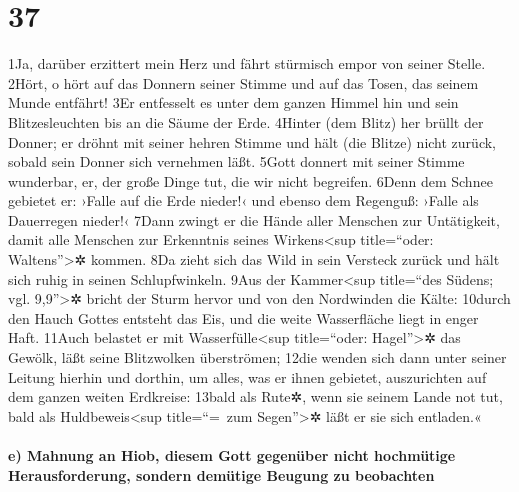 \hypertarget{section-36}{%
\section{37}\label{section-36}}

1Ja, darüber erzittert mein Herz und fährt stürmisch empor von seiner
Stelle. 2Hört, o hört auf das Donnern seiner Stimme und auf das Tosen,
das seinem Munde entfährt! 3Er entfesselt es unter dem ganzen Himmel hin
und sein Blitzesleuchten bis an die Säume der Erde. 4Hinter (dem Blitz)
her brüllt der Donner; er dröhnt mit seiner hehren Stimme und hält (die
Blitze) nicht zurück, sobald sein Donner sich vernehmen läßt. 5Gott
donnert mit seiner Stimme wunderbar, er, der große Dinge tut, die wir
nicht begreifen. 6Denn dem Schnee gebietet er: ›Falle auf die Erde
nieder!‹ und ebenso dem Regenguß: ›Falle als Dauerregen nieder!‹ 7Dann
zwingt er die Hände aller Menschen zur Untätigkeit, damit alle Menschen
zur Erkenntnis seines Wirkens\textless sup title=``oder:
Waltens''\textgreater✲ kommen. 8Da zieht sich das Wild in sein Versteck
zurück und hält sich ruhig in seinen Schlupfwinkeln. 9Aus der
Kammer\textless sup title=``des Südens; vgl. 9,9''\textgreater✲ bricht
der Sturm hervor und von den Nordwinden die Kälte: 10durch den Hauch
Gottes entsteht das Eis, und die weite Wasserfläche liegt in enger Haft.
11Auch belastet er mit Wasserfülle\textless sup title=``oder:
Hagel''\textgreater✲ das Gewölk, läßt seine Blitzwolken überströmen;
12die wenden sich dann unter seiner Leitung hierhin und dorthin, um
alles, was er ihnen gebietet, auszurichten auf dem ganzen weiten
Erdkreise: 13bald als Rute✲, wenn sie seinem Lande not tut, bald als
Huldbeweis\textless sup title=``=~zum Segen''\textgreater✲ läßt er sie
sich entladen.«

\hypertarget{e-mahnung-an-hiob-diesem-gott-gegenuxfcber-nicht-hochmuxfctige-herausforderung-sondern-demuxfctige-beugung-zu-beobachten}{%
\paragraph{e) Mahnung an Hiob, diesem Gott gegenüber nicht hochmütige
Herausforderung, sondern demütige Beugung zu
beobachten}\label{e-mahnung-an-hiob-diesem-gott-gegenuxfcber-nicht-hochmuxfctige-herausforderung-sondern-demuxfctige-beugung-zu-beobachten}}

